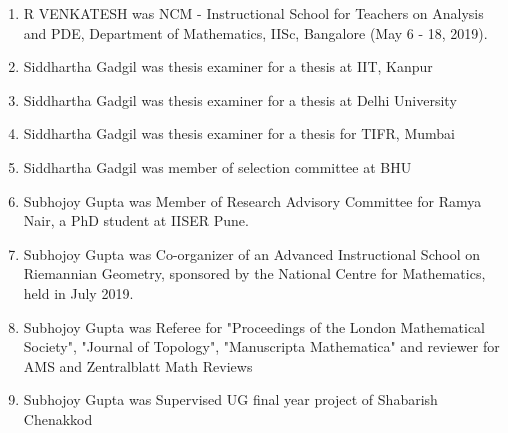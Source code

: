 \begin{enumerate}
\item R VENKATESH was NCM - Instructional School for Teachers on Analysis and PDE, Department of Mathematics, IISc, Bangalore (May 6 - 18, 2019). 
\item Siddhartha Gadgil was thesis examiner for a thesis at IIT, Kanpur
\item Siddhartha Gadgil was thesis examiner for a thesis at Delhi University
\item Siddhartha Gadgil was thesis examiner for a thesis for TIFR, Mumbai
\item Siddhartha Gadgil was member of selection committee at BHU
\item Subhojoy Gupta was Member of Research Advisory Committee for Ramya Nair, a PhD student at IISER Pune.
\item Subhojoy Gupta was Co-organizer of an Advanced Instructional School on Riemannian Geometry, sponsored by the National Centre for Mathematics, held in July 2019.
\item Subhojoy Gupta was Referee for "Proceedings of the London Mathematical Society", "Journal of Topology", "Manuscripta Mathematica" and reviewer for AMS and Zentralblatt Math Reviews
\item Subhojoy Gupta was Supervised UG final year project of Shabarish Chenakkod
\end{enumerate}

